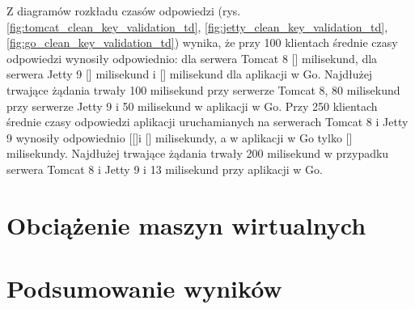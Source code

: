 Z diagramów rozkładu czasów odpowiedzi (rys. \ref{fig:tomcat_clean_key_validation_td}, \ref{fig:jetty_clean_key_validation_td}, \ref{fig:go_clean_key_validation_td}) wynika, że przy 100 klientach średnie czasy odpowiedzi wynosiły odpowiednio: dla serwera Tomcat 8 [] milisekund, dla serwera Jetty 9 [] milisekund i [] milisekund dla aplikacji w Go. Najdłużej trwające żądania trwały 100 milisekund przy serwerze Tomcat 8, 80 milisekund przy serwerze  Jetty 9 i 50 milisekund  w aplikacji w Go. Przy 250 klientach średnie czasy odpowiedzi aplikacji uruchamianych na serwerach Tomcat 8 i Jetty 9  wynosiły odpowiednio [[]i [] milisekundy, a w aplikacji w Go tylko [] milisekundy. Najdłużej trwające żądania trwały 200 milisekund w przypadku serwera Tomcat 8 i Jetty 9 i 13 milisekund przy aplikacji w Go. 


\clearpage

\section{Obciążenie maszyn wirtualnych}

\newpage
\section{Podsumowanie wyników}
